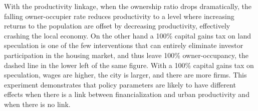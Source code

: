 With the productivity linkage, when the ownership ratio drops dramatically, %
the falling owner-occupier rate reduces productivity to a level where increasing returns to the population are offset by decreasing productivity, effectively crashing the local economy. %
On the other hand a 100\% capital gains tax on land speculation is one of the few interventions that can entirely eliminate investor participation in the housing market, and thus leave  100\%  owner-occupancy, the dashed line in the lower left of the same figure. %
With a 100\% capital gains tax on speculation, wages are  higher, the city is larger, and there are more firms. 
This experiment demonstrates that policy parameters are likely to have different effects when there is a link between financialization and urban productivity and when there is no link.



